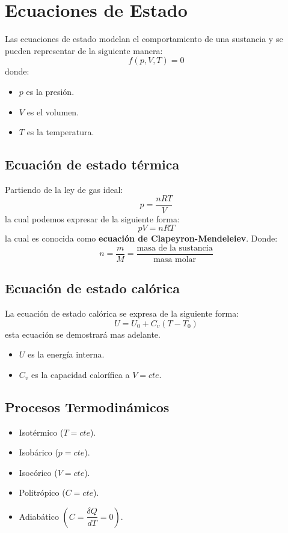 \documentclass[../main]{subfiles}
\begin{document}
\chapter{Ecuaciones de Estado}
Las ecuaciones de estado modelan el comportamiento de una sustancia y se pueden representar de la siguiente manera:
\begin{equation}
    f(p,V,T)=0
\end{equation}
donde:
\begin{itemize}
    \item $p$ es la presión.
    \item $V$ es el volumen.
    \item $T$ es la temperatura.
\end{itemize}
\section{Ecuación de estado térmica}
Partiendo de la ley de gas ideal:
    \begin{equation}
        p=\dfrac{n RT}{V}
    \end{equation}
la cual podemos expresar de la siguiente forma:
\begin{equation}
    pV=nRT
\end{equation}
la cual es conocida como \textbf{ecuación de Clapeyron-Mendeleiev}. Donde:
\begin{equation}
    n=\dfrac{m}{M}=\dfrac{\text{masa de la sustancia}}{\text{masa molar}}
\end{equation}
\section{Ecuación de estado calórica}
La ecuación de estado calórica se expresa de la siguiente forma:
\begin{equation}
    U=U_0+C_v(T-T_0)
\end{equation}
esta ecuación se demostrará mas adelante. 
\begin{itemize}
    \item $U$ es la energía interna.
    \item $C_v$ es la capacidad calorífica a $V=cte$.
\end{itemize}
\section*{Procesos Termodinámicos}
\begin{itemize}
    \item Isotérmico ($T=cte$).
    \item Isobárico ($p=cte$).
    \item Isocórico ($V=cte$).
    \item Politrópico ($C=cte$).
    \item Adiabático $\left(C=\dfrac{\delta Q}{dT}=0\right)$.
\end{itemize}
\end{document}
